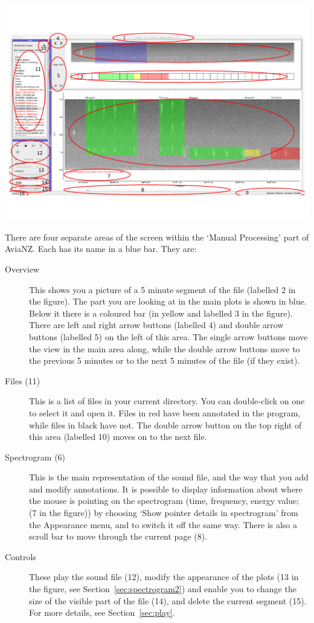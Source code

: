\documentclass{article}
\begin{document}
\newpage
\begin{center}
\includegraphics[width=.8\textwidth]{Figs/AviaNZInterface.pdf}
\end{center}

There are four separate areas of the screen within the `Manual Processing' part of AviaNZ. Each has its name in a blue bar. They are:
	\begin{description}
	\item[Overview] This shows you a picture of a 5 minute segment of the file (labelled 2 in the figure). The part you are looking at in the main plots is shown in blue. Below it there is a coloured bar (in yellow and labelled 3 in the figure). There are left and right arrow buttons (labelled 4) and double arrow buttons (labelled 5) on the left of this area. The single arrow buttons move the view in the main area along, while the double arrow buttons move to the previous 5 minutes or to the next 5 minutes of the file (if they exist). 
	\item [Files (11)] This is a list of files in your current directory. You can double-click on one to select it and open it. Files in red have been annotated in the program, while files in black have not. The double arrow button on the top right of this area (labelled 10) moves on to the next file.
	\item[Spectrogram (6)] This is the main representation of the sound file, and the way that you add and modify annotations. It is possible to display information about where the mouse is pointing on the spectrogram (time, frequency, energy value; (7 in the figure)) by choosing `Show pointer details in spectrogram' from the Appearance menu, and to switch it off the same way. There is also a scroll bar to move through the current page (8).
	\item[Controls] These play the sound file (12), modify the appearance of the plots (13 in the figure, see Section~\ref{sec:spectrogram2}) and enable you to change the size of the visible part of the file (14), and delete the current segment (15).  For more details, see  Section~\ref{sec:play}.
	\end{description}
\end{document}
